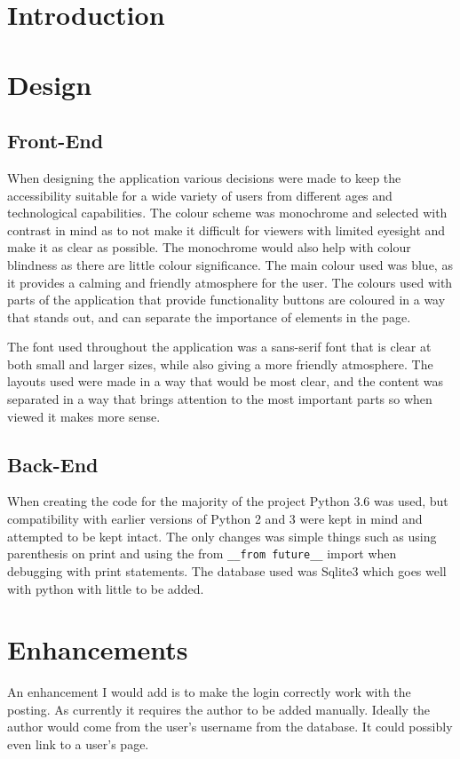 \documentclass[10pt, a4paper]{article}
\title{\mytitle}
\author{\myauthor\hspace{1em}\\\contact\\Edinburgh Napier University\hspace{0.5em}-\hspace{0.5em}\mymodule}
\date{}
\begin{document}
	\maketitle
	
	\section{Introduction}
	
	
	\section{Design}
	\subsection{Front-End}
	When designing the application various decisions were made to keep the accessibility suitable for a wide variety of users from different ages and technological capabilities. The colour scheme was monochrome and selected with contrast in mind as to not make it difficult for viewers with limited eyesight and make it as clear as possible. The monochrome would also help with colour blindness as there are little colour significance. The main colour used was blue, as it provides a calming and friendly atmosphere for the user. The colours used with parts of the application that provide functionality buttons are coloured in a way that stands out, and can separate the importance of elements in the page.
	
	The font used throughout the application was a sans-serif font that is clear at both small and larger sizes, while also giving a more friendly atmosphere. The layouts used were made in a way that would be most clear, and the content was separated in a way that brings attention to the most important parts so when viewed it makes more sense.
	
	\subsection{Back-End}
	When creating the code for the majority of the project Python 3.6 was used, but compatibility with earlier versions of Python 2 and 3 were kept in mind and attempted to be kept intact. The only changes was simple things such as using parenthesis on print and using the from \texttt{\_\_from future\_\_} import when debugging with print statements. The database used was Sqlite3 which goes well with python with little to be added.
	
	
	\section{Enhancements}
	An enhancement I would add is to make the login correctly work with the posting. As currently it requires the author to be added manually. Ideally the author would come from the user's username from the database. It could possibly even link to a user's page.
	
\end{document}
